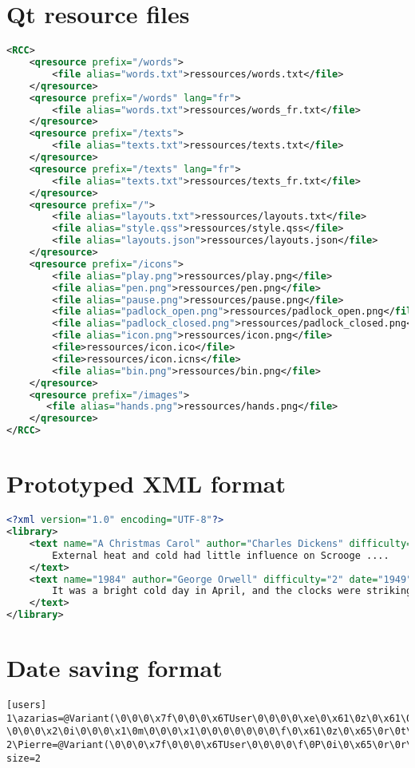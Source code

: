 \chapter{Qt resource files}
\begin{lstlisting}[language=XML]
<RCC>
    <qresource prefix="/words">
        <file alias="words.txt">ressources/words.txt</file>
    </qresource>
    <qresource prefix="/words" lang="fr">
        <file alias="words.txt">ressources/words_fr.txt</file>
    </qresource>
    <qresource prefix="/texts">
        <file alias="texts.txt">ressources/texts.txt</file>
    </qresource>
    <qresource prefix="/texts" lang="fr">
        <file alias="texts.txt">ressources/texts_fr.txt</file>
    </qresource>
    <qresource prefix="/">
        <file alias="layouts.txt">ressources/layouts.txt</file>
        <file alias="style.qss">ressources/style.qss</file>
        <file alias="layouts.json">ressources/layouts.json</file>
    </qresource>
    <qresource prefix="/icons">
        <file alias="play.png">ressources/play.png</file>
        <file alias="pen.png">ressources/pen.png</file>
        <file alias="pause.png">ressources/pause.png</file>
        <file alias="padlock_open.png">ressources/padlock_open.png</file>
        <file alias="padlock_closed.png">ressources/padlock_closed.png</file>
        <file alias="icon.png">ressources/icon.png</file>
        <file>ressources/icon.ico</file>
        <file>ressources/icon.icns</file>
        <file alias="bin.png">ressources/bin.png</file>
    </qresource>
    <qresource prefix="/images">
       <file alias="hands.png">ressources/hands.png</file>
    </qresource>
</RCC>
\end{lstlisting}

\chapter{Prototyped XML format}

\begin{lstlisting}[language=XML]
<?xml version="1.0" encoding="UTF-8"?>
<library>
	<text name="A Christmas Carol" author="Charles Dickens" difficulty="1" date="1843" >
		External heat and cold had little influence on Scrooge ....
	</text>
	<text name="1984" author="George Orwell" difficulty="2" date="1949" >
		It was a bright cold day in April, and the clocks were striking ...
	</text>
</library>
\end{lstlisting}

\chapter{Date saving format}
\begin{lstlisting}
[users]
1\azarias=@Variant(\0\0\0\x7f\0\0\0\x6TUser\0\0\0\0\xe\0\x61\0z\0\x61\0r\0i\0\x61\0s\0\0\0\n\0\0\0\x5\0\x61\0\0\0\x2\0\x65\0\0\0\x4\0 \0\0\0\x2\0i\0\0\0\x1\0m\0\0\0\x1\0\0\0\0\0\0\0\f\0\x61\0z\0\x65\0r\0t\0y)
2\Pierre=@Variant(\0\0\0\x7f\0\0\0\x6TUser\0\0\0\0\f\0P\0i\0\x65\0r\0r\0\x65\0\0\0\0\0\0\0\0\0\0\0\0\xff\xff\xff\xff)
size=2
\end{lstlisting}